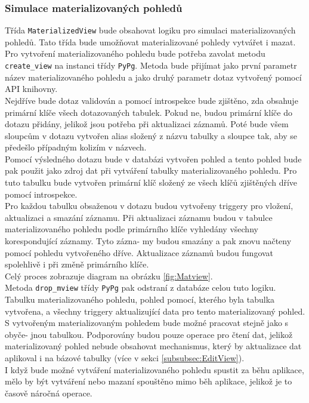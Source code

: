 \documentclass[ing,male,java,dept456]{diploma}						%
\begin{document}
\subsubsection{Simulace materializovaných pohledů}

Třída \lstinline[style=inlinepython]|MaterializedView| bude obsahovat logiku pro simulaci materializovaných pohledů. Tato třída bude umožňovat materializované pohledy vytvářet i mazat. Pro vytvoření materializovaného pohledu bude potřeba zavolat metodu \lstinline[style=inlinepython]|create_view| na instanci třídy \lstinline[style=inlinepython]|PyPg|. Metoda bude přijímat jako první parametr název materializovaného pohledu a jako druhý parametr dotaz vytvořený pomocí API knihovny. \\
Nejdříve bude dotaz validován a pomocí introspekce bude zjištěno, zda obsahuje primární klíče všech dotazovaných tabulek. Pokud ne, budou primární klíče do dotazu přidány, jelikož jsou potřeba při aktualizaci záznamů. Poté bude všem sloupcům v dotazu vytvořen alias složený z názvu tabulky a sloupce tak, aby se předešlo případným kolizím v názvech. \\
Pomocí výsledného dotazu bude v databázi vytvořen pohled a tento pohled bude pak použit jako zdroj dat při vytváření tabulky materializovaného pohledu. Pro tuto tabulku bude vytvořen primární klíč složený ze všech klíčů zjištěných dříve pomocí introspekce. \\
Pro každou tabulku obsaženou v dotazu budou vytvořeny triggery pro vložení, aktualizaci a smazání záznamu. Při aktualizaci záznamu budou v tabulce materializovaného pohledu podle primárního klíče vyhledány všechny korespondující záznamy. Tyto zázna- my budou smazány a pak znovu načteny pomocí pohledu vytvořeného dříve. Aktualizace záznamů budou fungovat spolehlivě i při změně primárního klíče. \\
Celý proces zobrazuje diagram na obrázku \ref{fig:Matview}. \\
Metoda \lstinline[style=inlinepython]|drop_mview| třídy \lstinline[style=inlinepython]|PyPg| pak odstraní z databáze celou tuto logiku. Tabulku materializovaného pohledu, pohled pomocí, kterého byla tabulka vytvořena, a všechny triggery aktualizující data pro tento materializovaný pohled. \\
S vytvořeným materializovaným pohledem bude možné pracovat stejně jako s obyče- jnou tabulkou. Podporovány budou pouze operace pro čtení dat, jelikož materializovaný pohled nebude obsahovat mechanismus, který by aktualizace dat aplikoval i na bázové tabulky (více v sekci \ref{subsubsec:EditView}). \\
I když bude možné vytváření materializovaného pohledu spustit za běhu aplikace, mělo by být vytváření nebo mazaní spouštěno mimo běh aplikace, jelikož je to časově náročná operace. \\
\end{document}
